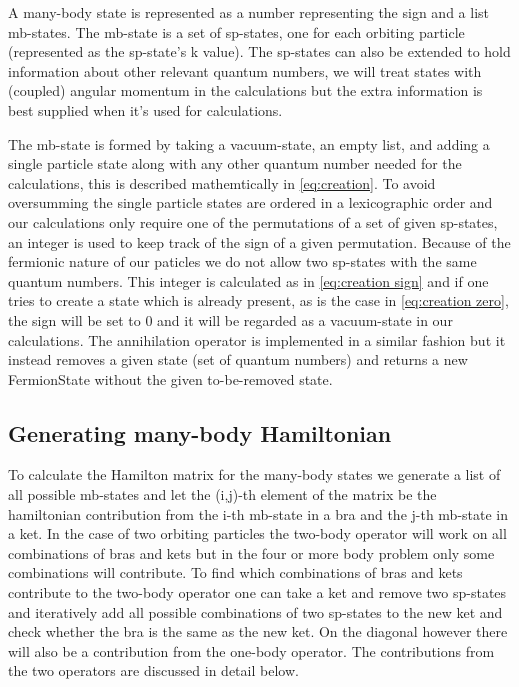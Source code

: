 A many-body state is represented as a number representing the sign and a list mb-states.
 The mb-state is a set of sp-states, one for each orbiting particle (represented as the sp-state's k value). 
 The sp-states can also be extended to hold information about other relevant quantum numbers, we will treat states with (coupled) angular momentum in the calculations but the extra information is best supplied when it's used for calculations.
 
 
 

 The mb-state is formed by taking a vacuum-state, an empty list, and adding a single particle state along with any other quantum number needed for the calculations, this is described mathemtically in \cref{eq:creation}.
 To avoid oversumming the single particle states are ordered in a lexicographic order and our calculations only require one of the permutations of a set of given sp-states, an integer is used to keep track of the sign of a given permutation. 
 Because of the fermionic nature of our paticles we do not allow two sp-states with the same quantum numbers.
 This integer is calculated as in \cref{eq:creation sign} and if one tries to create a state which is already present, as is the case in \cref{eq:creation zero}, the sign will be set to 0 and it will be regarded as a vacuum-state in our calculations.
 The annihilation operator is implemented in a similar fashion but it instead removes a given state (set of quantum numbers) and returns a new FermionState without the given to-be-removed state.
 
 
\subsection{Generating many-body Hamiltonian}
To calculate the Hamilton matrix for the many-body states we generate a list of all possible mb-states and let the (i,j)-th element of the matrix be the hamiltonian contribution from the i-th mb-state in a bra and the j-th mb-state in a ket. 
 In the case of two orbiting particles the two-body operator will work on all combinations of bras and kets but in the four or more body problem only some combinations will contribute.
 To find which combinations of bras and kets contribute to the two-body operator one can take a ket and remove two sp-states and iteratively add all possible combinations of two sp-states to the new ket and check whether the bra is the same as the new ket.
 On the diagonal however there will also be a contribution from the one-body operator.
 The contributions from the two operators are discussed in detail below.

